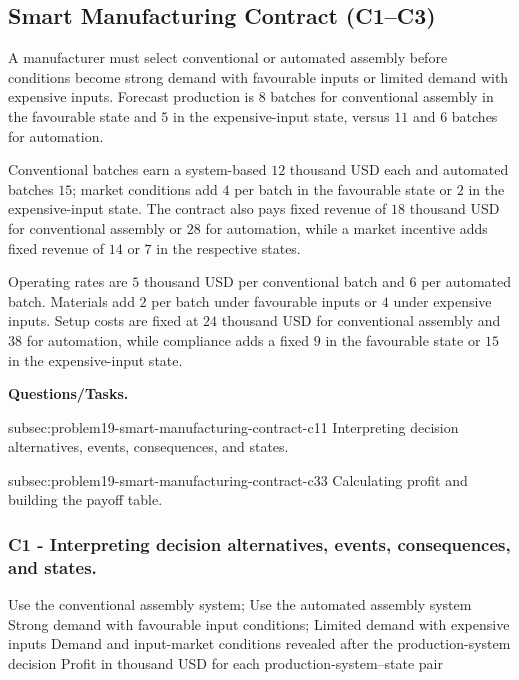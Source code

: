 	\subsection{Smart Manufacturing Contract (C1--C3)}
	\label{sec:problem19-smart-manufacturing-contract-c1-c3}

	A manufacturer must select conventional or automated assembly before conditions become strong demand with favourable inputs or limited demand with expensive inputs. Forecast production is \(8\) batches for conventional assembly in the favourable state and \(5\) in the expensive-input state, versus \(11\) and \(6\) batches for automation.

	Conventional batches earn a system-based \(12\) thousand USD each and automated batches \(15\); market conditions add \(4\) per batch in the favourable state or \(2\) in the expensive-input state. The contract also pays fixed revenue of \(18\) thousand USD for conventional assembly or \(28\) for automation, while a market incentive adds fixed revenue of \(14\) or \(7\) in the respective states.

	Operating rates are \(5\) thousand USD per conventional batch and \(6\) per automated batch. Materials add \(2\) per batch under favourable inputs or \(4\) under expensive inputs. Setup costs are fixed at \(24\) thousand USD for conventional assembly and \(38\) for automation, while compliance adds a fixed \(9\) in the favourable state or \(15\) in the expensive-input state.

	\textbf{Questions/Tasks.}
	\begin{enumerate}
		\CriterionTask
		{subsec:problem19-smart-manufacturing-contract-c1}{1}
		{Interpreting decision alternatives, events, consequences, and states.}

		\CriterionTask
		{subsec:problem19-smart-manufacturing-contract-c3}{3}
		{Calculating profit and building the payoff table.}
	\end{enumerate}

	\subsubsection*{C1 - Interpreting decision alternatives, events, consequences, and states.}
	\label{subsec:problem19-smart-manufacturing-contract-c1}

	\DecisionElementsTable
	{Use the conventional assembly system; Use the automated assembly system}
	{Strong demand with favourable input conditions; Limited demand with expensive inputs}
	{Demand and input-market conditions revealed after the production-system decision}
	{Profit in thousand USD for each production-system--state pair}

